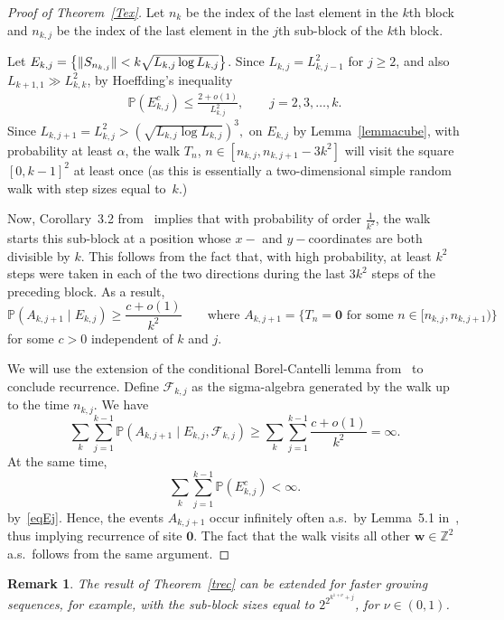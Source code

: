 \documentclass[12pt]{article}
\newtheorem{remark}{Remark}
\renewcommand\P{\mathbb{P}}
\newcommand\Z{\mathbb{Z}}
\DeclarePairedDelimiter{\norm}{\lVert}{\rVert}
\begin{document}
\begin{proof}[Proof of Theorem~\ref{Tex}]
Let $n_k$ be the index of the last element in the $k$th block and $n_{k,j}$  be the index of the last element in the $j$th sub-block of the $k$th block. %

Let $E_{k,j}=\left\{\norm{S_{n_{k,j}}}< k \sqrt{L_{k,j}\log L_{k,j} }\right\}$. Since $L_{k,j}=L_{k,j-1}^2$ for $j\ge 2$, and also $L_{k+1,1}\gg L_{k,k}^2$, by Hoeffding's inequality
\begin{align}\label{eqEj}
\P(E_{k,j}^c)\le \frac{2+o(1)}{L_{k,j}^2},
\qquad j=2,3,\dots,k.
\end{align}
Since 
$
L_{k,j+1}=L_{k,j}^2>\left(\sqrt{L_{k,j}\log L_{k,j}}\right)^3,
$
on $E_{k,j}$ by Lemma~\ref{lemmacube}, with probability at least $\alpha$, the walk $T_n$, $n\in [n_{k,j},n_{k,j+1}-3k^2]$ will visit the square $[0,k-1]^2$ at least once (as this is essentially a two-dimensional simple random walk with step sizes equal to~$k$.)

Now, Corollary~3.2 from~\cite{BV} implies that with probability of order $\frac{1}{k^2}$, the walk starts this sub-block at a position whose $x-$ and $y-$coordinates are both divisible by $k$. This follows from the fact that, with high probability, at least $k^2$ steps were taken in each of the two directions during the last 
$3k^2$ steps of the preceding block. As a result, 
$$
\P(A_{k,j+1}\mid {E}_{k,j})\ge \frac{c+o(1)}{k^2}
\qquad \text{where } A_{k,j+1}=\{T_n=\mathbf{0}\text{ for some }
n\in[n_{k,j},n_{k,j+1})\}
$$
for some $c>0$ independent of $k$ and $j$.

We will use the extension of the conditional Borel-Cantelli lemma from~\cite{BV} to conclude recurrence. Define $\mathcal{F}_{k,j}$ as the sigma-algebra generated by the walk up to the time $n_{k,j}$. We have 
$$
\sum_k\sum_{j=1}^{k-1}\P(A_{k,j+1}\mid E_{k,j},\mathcal{F}_{k,j})\ge  \sum_k \sum_{j=1}^{k-1}\frac{c+o(1)}{k^2}=\infty.
$$
At the same time,
$$
\sum_k \sum_{j=1}^{k-1}\P(E_{k,j}^c)<\infty.
$$
by~\eqref{eqEj}.
Hence, the events $A_{k,j+1}$ occur infinitely often a.s.\ by Lemma~5.1 in~\cite{BV}, thus implying recurrence of site $\mathbf{0}$. The fact that the walk visits all other $\mathbf{w}\in\Z^2$ a.s.\  follows from the same argument.
\end{proof}

\begin{remark}
The result of Theorem~\ref{trec} can be extended for faster growing sequences, for example, with the sub-block sizes equal to $2^{2^{k^{1+\nu}+j}}$, for  $\nu\in(0,1)$.
\end{remark}
\end{document}
